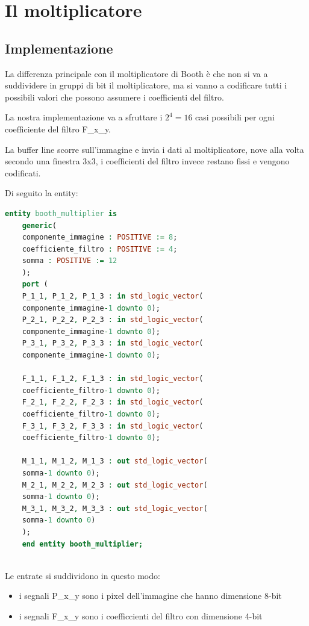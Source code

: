 \maketitle
\chapter{Il moltiplicatore}
\section{Implementazione}
La differenza principale con il moltiplicatore di Booth è che non si va a suddividere in gruppi di bit il moltiplicatore, ma si vanno a codificare tutti i possibili valori che possono assumere i coefficienti del filtro.

La nostra implementazione va a sfruttare i $2^4=16$ casi possibili per ogni coefficiente del filtro F\_x\_y.

La buffer line scorre sull'immagine e invia i dati al moltiplicatore, nove alla volta secondo una finestra 3x3, i coefficienti del filtro invece restano fissi e vengono codificati.

Di seguito la entity:
\begin{lstlisting}[language=VHDL, caption={Entity del moltiplicatore}]
	entity booth_multiplier is
	generic(
	componente_immagine : POSITIVE := 8;
	coefficiente_filtro : POSITIVE := 4;
	somma : POSITIVE := 12
	);
	port (
	P_1_1, P_1_2, P_1_3 : in std_logic_vector(
	componente_immagine-1 downto 0);
	P_2_1, P_2_2, P_2_3 : in std_logic_vector(
	componente_immagine-1 downto 0);
	P_3_1, P_3_2, P_3_3 : in std_logic_vector(
	componente_immagine-1 downto 0);
	
	F_1_1, F_1_2, F_1_3 : in std_logic_vector(
	coefficiente_filtro-1 downto 0);
	F_2_1, F_2_2, F_2_3 : in std_logic_vector(
	coefficiente_filtro-1 downto 0);
	F_3_1, F_3_2, F_3_3 : in std_logic_vector(
	coefficiente_filtro-1 downto 0);
	
	M_1_1, M_1_2, M_1_3 : out std_logic_vector(
	somma-1 downto 0);
	M_2_1, M_2_2, M_2_3 : out std_logic_vector(
	somma-1 downto 0);
	M_3_1, M_3_2, M_3_3 : out std_logic_vector(
	somma-1 downto 0)
	);
	end entity booth_multiplier;
	
\end{lstlisting}

Le entrate si suddividono in questo modo:
\begin{itemize}
	\item  i segnali P\_x\_y sono i pixel dell'immagine che hanno dimensione 8-bit
	\item i segnali F\_x\_y sono i coefficcienti del filtro con dimensione 4-bit
\end{itemize} 

